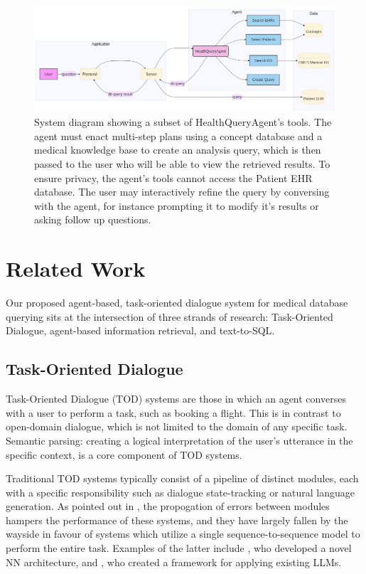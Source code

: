 \documentclass[11pt]{article}
\begin{document}
\begin{figure}[t]
  \includegraphics[width=\linewidth]{content/system_diagram3.png}
	\caption{System diagram showing a subset of HealthQueryAgent's tools. The agent must enact multi-step plans using a concept database and a medical knowledge base to create an analysis query, which is then passed to the user who will be able to view the retrieved results. To ensure privacy, the agent's tools cannot access the Patient EHR database. The user may interactively refine the query by conversing with the agent, for instance prompting it to modify it's results or asking follow up questions.}
	\label{fig:system-diagram}
\end{figure}

\section{Related Work}

Our proposed agent-based, task-oriented dialogue system for medical database querying sits at the intersection of three strands of research: Task-Oriented Dialogue, agent-based information retrieval, and text-to-SQL.

\subsection{Task-Oriented Dialogue}
Task-Oriented Dialogue (TOD) systems are those in which an agent converses with a user to perform a task, such as booking a flight. This is in contrast to open-domain dialogue, which is not limited to the domain of any specific task. Semantic parsing: creating a logical interpretation of the user's utterance in the specific context, is a core component of TOD systems.

Traditional TOD systems typically consist of a pipeline of distinct modules, each with a specific responsibility such as dialogue state-tracking or natural language generation.
As pointed out in \citet{yi_a_survery_2024}, the propogation of errors between modules hampers the performance of these systems, and they have largely fallen by the wayside in favour of systems which utilize a single sequence-to-sequence model to perform the entire task. Examples of the latter include \citet{wen_network-based_2017}, who developed a novel NN architecture, and \citet{xu_rethinking_2024}, who created a framework for applying existing LLMs.
\end{document}

